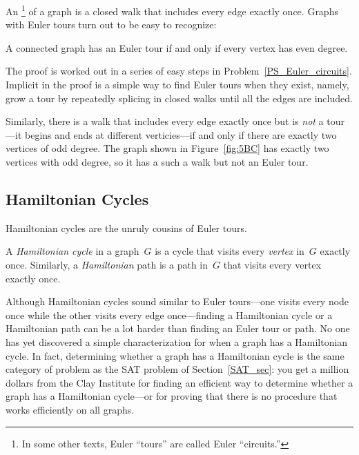 An \footnote{In some other texts, Euler ``tours'' are
  called Euler ``circuits.''} of a graph is a closed walk that
includes every edge exactly once.  Graphs with Euler tours turn out to
be easy to recognize:

\begin{theorem}\label{thm:euler-tour}
A connected graph has an Euler tour if and only if every vertex has
even degree.
\end{theorem}

The proof is worked out in a series of easy steps in
Problem~\ref{PS_Euler_circuits}.  Implicit in the proof is a simple
way to find Euler tours when they exist, namely, grow a tour by
repeatedly splicing in closed walks until all the edges are included.

Similarly, there is a walk that includes every edge exactly once but
is \emph{not} a tour---it begins and ends at different verticies---if
and only if there are exactly two vertices of odd degree.  The graph
shown in Figure~\ref{fig:5BC} has exactly two vertices with odd
degree, so it has a such a walk but not an Euler tour.

\subsection{Hamiltonian Cycles}

Hamiltonian cycles are the unruly cousins of Euler tours.

\begin{definition}\label{def:hamiltonian-cycle}
A \emph{Hamiltonian cycle} in a graph~$G$ is a cycle that visits every
\emph{vertex} in~$G$ exactly once.  Similarly, a \emph{Hamiltonian}
path is a path in~$G$ that visits every vertex exactly once.
\end{definition}

Although Hamiltonian cycles sound similar to Euler tours---one visits
every node once while the other visits every edge once---finding a
Hamiltonian cycle or a Hamiltonian path can be a lot harder than
finding an Euler tour or path.  No one has yet discovered a simple
characterization for when a graph has a Hamiltonian cycle.  In fact,
determining whether a graph has a Hamiltonian cycle is the same
category of problem as the SAT problem of Section~\ref{SAT_sec}: you
get a million dollars from the Clay Institute for finding an efficient
way to determine whether a graph has a Hamiltonian cycle---or for
proving that there is no procedure that works efficiently on all
graphs.


